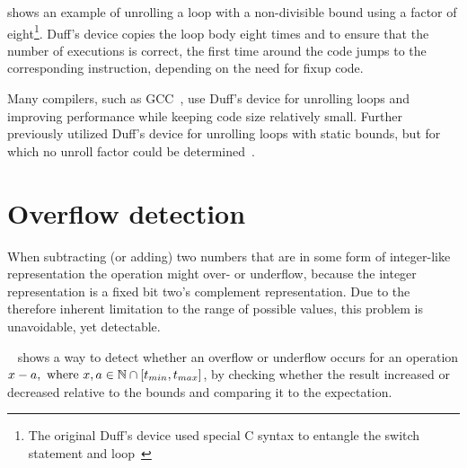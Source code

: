  shows an example of unrolling a loop with a non-divisible bound using a factor of eight\footnote{The original Duff's device used special C syntax to entangle the switch statement and loop~\cite{duff_1983}}.
Duff's device copies the loop body eight times and to ensure that the number of executions is correct, the first time around the code jumps to the corresponding instruction, depending on the need for fixup code.

Many compilers, such as GCC~\cite{gcc}, use Duff's device for unrolling loops and improving performance while keeping code size relatively small.
Further \libFIRM{} previously utilized Duff's device for unrolling loops with static bounds, but for which no unroll factor could be determined~\cite{helmer10studienarbeit}.



\section{Overflow detection}\label{sec:basics:overflow}

When subtracting (or adding) two numbers that are in some form of integer-like representation the operation might over- or underflow, because the integer representation is a fixed bit two's complement representation.
Due to the therefore inherent limitation to the range of possible values, this problem is unavoidable, yet detectable.

~\cite{pmg_2009} shows a way to detect whether an overflow or underflow occurs for an operation $x - a, \text{ where } x, a \in \mathbb{N} \cap {\lbrack t_{min}, t_{max} \rbrack}$, by checking whether the result increased or decreased relative to the bounds and comparing it to the expectation.


